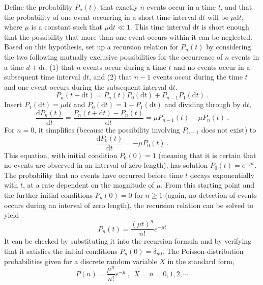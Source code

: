 \documentclass[12pt,a4paper]{article}
\newcommand{\dif}{\mathrm{d}}
\begin{document}
Define the probability $P_n(t)$ that exactly $n$ events occur in a time $t$, and that the probability of one event occurring in a short time interval $\dif t$ will be $\mu \dif t$, where $\mu$ is a constant such that $\mu \dif t \ll 1$. This time interval $\dif t$ is short enough that  the possibility that more than one event occurs within it can be neglected. Based on this hypothesis, set up a recursion relation for $P_n(t)$ by considering the two following mutually exclusive possibilities for the occurrence of $n$ events in a time $d + \dif t$: (1) that $n$ events occur during a time $t$ and no events occur in a subsequent time interval $\dif t$, and (2) that $n -1$ events occur during the time $t$ and one event occurs during the subsequent interval $\dif t$.
\begin{equation*}
P_n(t+\dif t) = P_n(t) P_0(\dif t) +P_{n-1} P_1(\dif t) ~.
\end{equation*}
Insert $P_1(\dif t) = \mu \dif t$ and $P_0(\dif t) = 1 - P_1(\dif t)$ and dividing through by $\dif t$, 
\begin{equation}
\dfrac{\dif P_n(t)}{\dif t} = \dfrac{P_n(t +\dif t) -P_n(t)}{\dif t} = \mu P_{n-1}(t) -\mu P_n(t) ~.
\end{equation}
For $n = 0$, it simplifies (because the possibility involving $P_{n-1}$ does not exist) to
\begin{equation*}
\dfrac{\dif P_0(t)}{\dif t} = -\mu P_0(t) ~.
\end{equation*}
This equation, with initial condition $P_0(0) = 1$ (meaning that it is certain that no events are observed in an interval of zero length), has solution $P_0(t) = e^{-\mu t}$. The probability that no events have occurred before time $t$ decays exponentially with $t$, at a rate dependent on the magnitude of $\mu$. From this starting point and the further initial conditions $P_n(0) = 0$ for $n \geqslant 1$ (again, no detection of events occurs during an interval of zero length), the recursion relation can be solved to yield
\begin{equation}
P_n(t) = \frac{(\mu t)^n}{n !} e^{-\mu t}
\end{equation}
It can be checked by substituting it into the recursion formula and by verifying that it satisfies the initial conditions $P_n(0) = \delta_{n0}$.
The Poisson-distribution probabilities given for a discrete random variable $X$ in the standard form,
\begin{equation}
P(n) = \frac{\mu^n}{n !} e^{-\mu} ~, ~~ X = n = 0, 1, 2, \cdots 
\end{equation}
\end{document}
